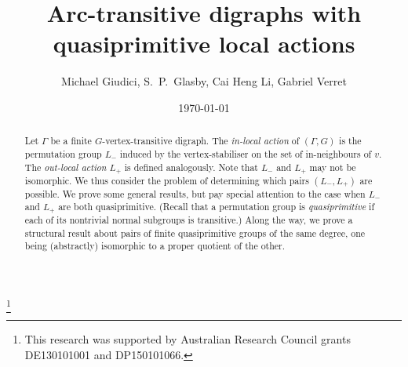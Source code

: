 \documentclass[twoside,12pt,leqno]{amsproc}
\numberwithin{table}{section}
\numberwithin{figure}{section}
\theoremstyle{plain}
\theoremstyle{definition}\newtheorem{definition}[theorem]{Definition}
\theoremstyle{definition}\newtheorem{example}[theorem]{Example}
\theoremstyle{definition}\newtheorem{construction}[theorem]{Construction}
\theoremstyle{definition}\newtheorem{remark}[theorem]{Remark}
\theoremstyle{definition}\newtheorem{problem}[theorem]{Problem}
\begin{document}
\hyphenation{}

\title{Arc-transitive digraphs with\\ quasiprimitive local actions}
\author[M. Giudici, S.~P.~Glasby, C. H. Li, G. Verret]{Michael Giudici, S.~P.~Glasby, Cai Heng Li, Gabriel Verret} 

 \address{Michael Giudici, S.~P.~Glasby$^*$ and Gabriel Verret$^\dag$
\newline\indent Centre for the Mathematics of Symmetry and Computation, 
\newline\indent The University of Western Australia, 
\newline{} Stirling Highway, Crawley, WA 6009, Australia.}

\address{Cai Heng Li, Department of Mathematics, 
   South University of Science and\newline\indent Technology of China,
   Shenzhen, Guangdong 518055, P. R. China.}

\address{$^*$Also affiliated with The Department of Mathematics, 
\newline\indent University of Canberra, ACT 2601, Australia.}

\address{$\dag$Also affiliated with FAMNIT, University of Primorska, 
\newline\indent Glagolja\v{s}ka 8, SI-6000 Koper, Slovenia.
\newline\indent Current address: Department of Mathematics, The University of Auckland,
\newline\indent Private Bag 92019, Auckland 1142, New Zealand.}


\thanks{This research was supported by Australian Research Council grants DE130101001 and DP150101066.}



\date{\today}

\begin{abstract}
Let $\Gamma$ be a finite $G$-vertex-transitive digraph. The \emph{in-local action} of $(\Gamma,G)$ is the permutation group $L_-$ induced by the vertex-stabiliser on  the set of in-neighbours of $v$. The \emph{out-local action} $L_+$ is defined analogously. Note that $L_-$ and $L_+$ may not be isomorphic. We thus consider the problem of determining which pairs $(L_-,L_+)$ are possible. We prove some general results, but pay special attention to the case when $L_-$ and $L_+$ are both quasiprimitive. (Recall that a permutation group is \emph{quasiprimitive} if each of its nontrivial normal  subgroups is transitive.) Along the way, we prove a structural result about pairs of finite quasiprimitive groups of the same degree, one being (abstractly) isomorphic to a proper quotient of the other.
\end{abstract}
\end{document}
